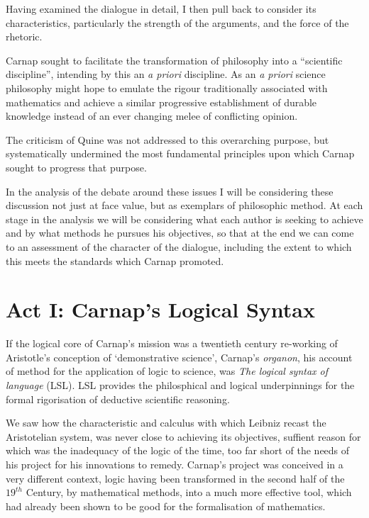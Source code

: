 Having examined the dialogue in detail, I then pull back to consider its characteristics,
particularly the strength of the arguments, and the force of the rhetoric.

Carnap sought to facilitate the transformation of philosophy into a ``scientific discipline'', intending by this an \emph{a priori} discipline.
As an \emph{a priori} science philosophy might hope to emulate the rigour traditionally associated with mathematics and achieve a similar progressive establishment of durable knowledge instead of an ever changing melee of conflicting opinion.

The criticism of Quine was not addressed to this overarching purpose, but systematically undermined the most fundamental principles upon which Carnap sought to progress that purpose.

In the analysis of the debate around these issues I will be considering these discussion not just at face value, but as exemplars of philosophic method.
At each stage in the analysis we will be considering what each author is seeking to achieve and by what methods he pursues his objectives, so that at the end we can come to an assessment of the character of the dialogue, including the extent to which this meets the standards which Carnap promoted.

\section{Act I: Carnap's Logical Syntax}

If the logical core of Carnap's mission was a twentieth century re-working of Aristotle's conception of `demonstrative science', Carnap's {\it organon}, his account of method for the application of logic to science, was {\it The logical syntax of language} \cite{carnap34} (LSL).
LSL provides the philosphical and logical underpinnings for the formal rigorisation of deductive  scientific reasoning.

We saw how the characteristic and calculus with which Leibniz recast the Aristotelian system, was never close to achieving its objectives, suffient reason for which was the inadequacy of the logic of the time, too far short of the needs of his project for his innovations to remedy.
Carnap's project was conceived in a very different context, logic having been transformed in the second half of the $19^{th}$ Century, by mathematical methods, into a much more effective tool, which had already been shown to be good for the formalisation of mathematics.

